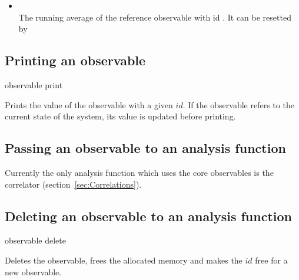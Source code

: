   \begin{itemize}
    \item {} \\
      The running average of the reference observable with id . 
      It can be resetted by 
  \end{itemize}
\subsection{Printing an observable}
\begin{essyntax}
observable  print 
\end{essyntax}
Prints the value of the observable with a given $id$. If the observable
refers to the current state of the system, its value is updated before printing.

\subsection{Passing an observable to an analysis function}
Currently the only analysis function which uses the core observables
is the correlator (section~\ref{sec:Correlations}).

\subsection{Deleting an observable to an analysis function}
\begin{essyntax}
observable  delete
\end{essyntax}
Deletes the observable, \ie frees the allocated memory
and makes the $id$ free for a new observable.


